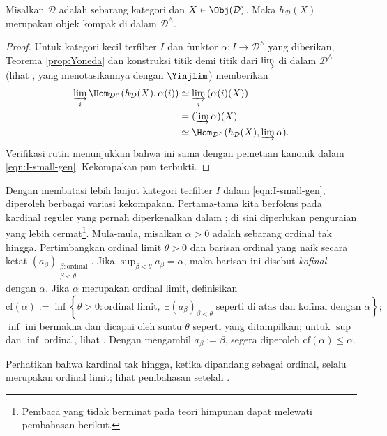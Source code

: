 \begin{proposition}\label{prop:Ind-cpt}
	Misalkan $\mathcal{D}$ adalah sebarang kategori dan $X \in \Obj(\mathcal{D})$. Maka $h_{\mathcal{D}}(X)$ merupakan objek kompak di dalam $\mathcal{D}^\wedge$.
\end{proposition}
\begin{proof}
	Untuk kategori kecil terfilter $I$ dan funktor $\alpha: I \to \mathcal{D}^\wedge$ yang diberikan, Teorema \ref{prop:Yoneda} dan konstruksi titik demi titik dari $\varinjlim$ di dalam $\mathcal{D}^\wedge$ (lihat \cite[Proposisi 2.7.8]{Li1}, yang menotasikannya dengan $\Yinjlim$) memberikan
	\begin{align*}
		\varinjlim_i \Hom_{\mathcal{D}^{\wedge}}(h_{\mathcal{D}}(X), \alpha(i)) & \simeq \varinjlim_i \left(\alpha(i)(X)\right) \\
		& = (\varinjlim \alpha)(X) \\
		& \simeq \Hom_{\mathcal{D}^\wedge}(h_{\mathcal{D}}(X), \varinjlim \alpha).
	\end{align*}
	Verifikasi rutin menunjukkan bahwa ini sama dengan pemetaan kanonik dalam \eqref{eqn:I-small-gen}. Kekompakan pun terbukti.
\end{proof}

Dengan membatasi lebih lanjut kategori terfilter $I$ dalam \eqref{eqn:I-small-gen}, diperoleh berbagai variasi kekompakan. Pertama-tama kita berfokus pada kardinal reguler yang pernah diperkenalkan dalam \cite[Definisi 1.4.10]{Li1}; di sini diperlukan penguraian yang lebih cermat\footnote{Pembaca yang tidak berminat pada teori himpunan dapat melewati pembahasan berikut.}. Mula-mula, misalkan $\alpha > 0$ adalah sebarang ordinal tak hingga. Pertimbangkan ordinal limit $\theta > 0$ dan barisan ordinal yang naik secara ketat $(a_\beta)_{\substack{\beta: \text{ordinal} \\ \beta < \theta}}$. Jika $\sup_{\beta < \theta} a_\beta = \alpha$, maka barisan ini disebut \emph{kofinal} dengan $\alpha$. Jika $\alpha$ merupakan ordinal limit, definisikan
\[ \mathrm{cf}(\alpha) := \inf\left\{ \theta > 0: \text{ordinal limit}, \; \exists (a_\beta)_{\beta < \theta}\; \text{seperti di atas dan kofinal dengan $\alpha$} \right\}; \]
$\inf$ ini bermakna dan dicapai oleh suatu $\theta$ seperti yang ditampilkan; untuk $\sup$ dan $\inf$ ordinal, lihat \cite[Teorema 1.2.10]{Li1}. Dengan mengambil $a_\beta := \beta$, segera diperoleh $\mathrm{cf}(\alpha) \leq \alpha$.

Perhatikan bahwa kardinal tak hingga, ketika dipandang sebagai ordinal, selalu merupakan ordinal limit; lihat pembahasan setelah \cite[Lema 1.4.6]{Li1}.

